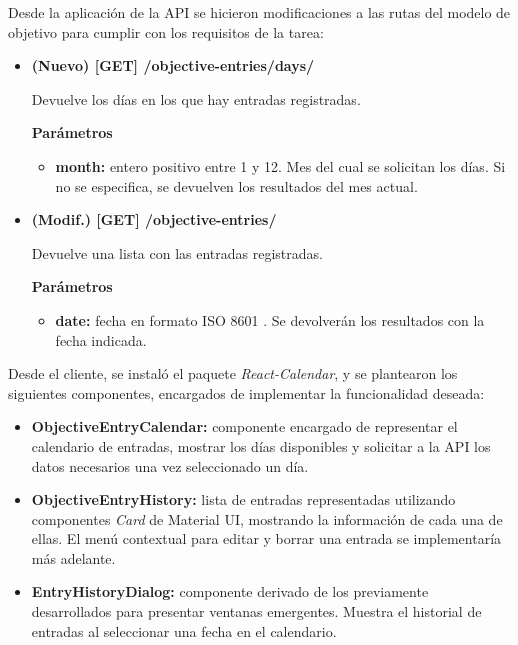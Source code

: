 \documentclass[10pt, a4paper]{aqademic}
\begin{document}
Desde la aplicación de la API se hicieron modificaciones a las rutas del modelo de objetivo para cumplir con los requisitos de la tarea:

\begin{itemize}
	\item \textbf{(Nuevo) [GET] /objective-entries/days/} 
	
	Devuelve los días en los que hay entradas registradas.
	
	\textbf{Parámetros}
	
	\begin{itemize}
		\item \textbf{month:} entero positivo entre 1 y 12. Mes del cual se solicitan los días. Si no se especifica, se devuelven los resultados del mes actual.
	\end{itemize}

	\item \textbf{(Modif.) [GET] /objective-entries/} 
	
	Devuelve una lista con las entradas registradas.

	\textbf{Parámetros}
	
	\begin{itemize}
		\item \textbf{date:} fecha en formato ISO 8601 \cite{houston1993iso}. Se devolverán los resultados con la fecha indicada.
	\end{itemize}
\end{itemize}

\medskip

Desde el cliente, se instaló el paquete \textit{React-Calendar}, y se plantearon los siguientes componentes, encargados de implementar la funcionalidad deseada:

\begin{itemize}
	\item \textbf{ObjectiveEntryCalendar:} componente encargado de representar el calendario de entradas, mostrar los días disponibles y solicitar a la API los datos necesarios una vez seleccionado un día.
	
	\item \textbf{ObjectiveEntryHistory:} lista de entradas representadas utilizando componentes \textit{Card} de Material UI, mostrando la información de cada una de ellas. El menú contextual para editar y borrar una entrada se implementaría más adelante.
	
	\item \textbf{EntryHistoryDialog:} componente derivado de los previamente desarrollados para presentar ventanas emergentes. Muestra el historial de entradas al seleccionar una fecha en el calendario.
\end{itemize}
\end{document}
